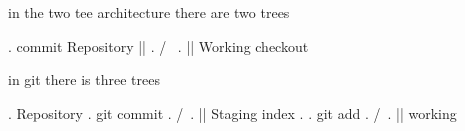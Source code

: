 in the two tee architecture there are two trees 

.     commit      Repository      || 
.      /\                         \/
.      ||          Working     checkout



in git there is three trees 

.              Repository 
.  git commit
.   /\
.   ||         Staging index  
.
.  git add 
.    /\
.    ||        working 
